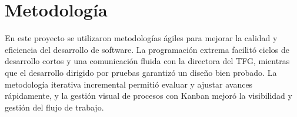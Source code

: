 \chapter{Metodología}\label{ch:chapter_3}

En este proyecto se utilizaron metodologías ágiles para mejorar la calidad y eficiencia del desarrollo de software.
La programación extrema facilitó ciclos de desarrollo cortos y una comunicación fluida con la directora del TFG,
mientras que el desarrollo dirigido por pruebas garantizó un diseño bien probado.
La metodología iterativa incremental permitió evaluar y ajustar avances rápidamente, y la gestión visual de procesos con
Kanban mejoró la visibilidad y gestión del flujo de trabajo.



